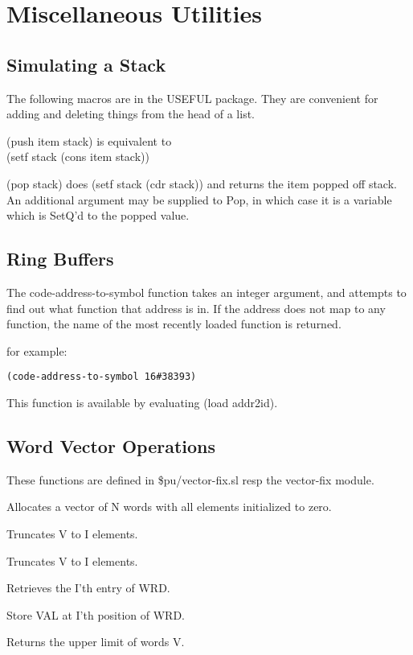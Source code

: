 \chapter{Miscellaneous Utilities}

\section{Simulating a Stack}

  The  following  macros  are  in  the USEFUL package.  They are
convenient for adding and deleting things from  the  head  of  a
list.


{
(push item stack) is equivalent to\\
(setf stack (cons item stack))
}

{
(pop stack) does (setf stack (cdr stack)) and returns the item 
popped off stack. An additional argument may be supplied to Pop, in which 
case it is a variable which is SetQ'd to the popped value.
}

\section{Ring Buffers}

  The code-address-to-symbol function takes an integer argument,
and attempts to find out what function that address is  in.   If
the  address  does not map to any function, the name of the most
recently loaded function is returned.

{}
  for example:

\begin{verbatim}
(code-address-to-symbol 16#38393)
\end{verbatim}
  This function is available by evaluating (load addr2id).

\section{Word Vector Operations}

  These functions are defined in \$pu/vector-fix.sl
  resp the vector-fix module.


{    Allocates a vector of N words with all elements  initialized
    to zero.
}

{    Truncates V to I elements.
}

{    Truncates V to I elements.
}

{    Retrieves the I'th entry of WRD.
}

{    Store VAL at I'th position of WRD.
}

{    Returns the upper limit of words V.
}

